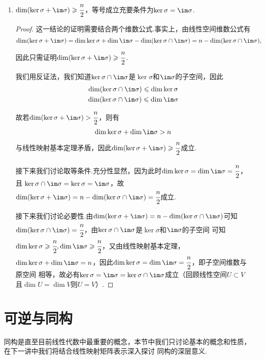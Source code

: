 \begin{enumerate}
\begin{proof}
    \end{proof}

    \item $\dim(\ker\sigma+\im \sigma) \geqslant \cfrac{n}{2}$，等号成立充要条件为$\ker\sigma=\im \sigma$.
    
    \begin{proof}
        这一结论的证明需要结合两个维数公式.事实上，由线性空间维数公式有
        \[\dim(\ker\sigma+\im \sigma)=\dim\ker\sigma+\dim\im \sigma-\dim(\ker\sigma \cap \im \sigma)=n-\dim(\ker\sigma \cap \im \sigma),\]
        因此只需证明$\dim(\ker\sigma+\im \sigma) \geqslant \cfrac{n}{2}$.

        我们用反证法，我们知道$\ker\sigma\cap \im \sigma$是$\ker\sigma$和$\im\sigma$的子空间，因此
        \begin{gather*}
            \dim(\ker\sigma\cap \im \sigma) \leqslant \dim\ker\sigma \\
            \dim(\ker\sigma\cap \im \sigma) \leqslant \dim\im\sigma
        \end{gather*}
        故若$\dim(\ker\sigma+\im \sigma)>\cfrac{n}{2}$，则有
        \[\dim\ker\sigma+\dim\im \sigma>n\]
        与线性映射基本定理矛盾，因此$\dim(\ker\sigma+\im \sigma) \geqslant \cfrac{n}{2}$成立.

        接下来我们讨论取等条件.充分性显然，因为此时$\dim\ker\sigma=\dim\im\sigma=\cfrac{n}{2}$，且
        $\ker\sigma\cap \im \sigma=\ker\sigma=\im\sigma$，故$\dim(\ker\sigma+\im \sigma)=n-\dim(\ker\sigma \cap \im \sigma)=\cfrac{n}{2}$成立.

        接下来我们讨论必要性.由$\dim(\ker\sigma+\im \sigma)=n-\dim(\ker\sigma \cap \im \sigma)$可知
        $\dim(\ker\sigma\cap \im \sigma)=\cfrac{n}{2}$，由$\ker\sigma\cap \im \sigma$是$\ker\sigma$和$\im\sigma$的子空间
        可知$\dim\ker\sigma\geqslant\cfrac{n}{2},\dim\im \sigma\geqslant\cfrac{n}{2}$，又由线性映射基本定理，
        $\dim\ker\sigma+\dim\im \sigma=n$，因此$\dim\ker\sigma=\dim\im \sigma=\cfrac{n}{2}$，即子空间维数与原空间
        相等，故必有$\ker\sigma=\im \sigma=\ker\sigma\cap \im \sigma$成立（回顾线性空间$U\subset V$且$\dim U=\dim V$则$U=V$）.
    \end{proof}
\end{enumerate}

\section{可逆与同构}
同构是直至目前线性代数中最重要的概念，本节中我们只讨论基本的概念和性质，在下一讲中我们将结合线性映射矩阵表示深入探讨
同构的深层意义.
